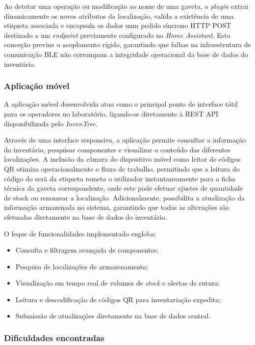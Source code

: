 \documentclass[10pt]{article}
\begin{document}
Ao detetar uma operação ou modificação ao nome de uma gaveta, o \textit{plugin} extrai dinamicamente os novos atributos da localização, valida a existência de uma etiqueta associada e encapsula os dados num pedido síncrono HTTP POST destinado a um \textit{endpoint} previamente configurado no \textit{Home Assistant}. Esta conceção previne o acoplamento rígido, garantindo que falhas na infraestrutura de comunicação BLE não corrompam a integridade operacional da base de dados do inventário.

\subsubsection{Aplicação móvel}

A aplicação móvel desenvolvida atua como o principal ponto de interface tátil para os operadores no laboratório, ligando-se diretamente à REST API disponibilizada pelo \textit{InvenTree}.

Através de uma interface responsiva, a aplicação permite consultar a informação do inventário, pesquisar componentes e visualizar o conteúdo das diferentes localizações. A inclusão da câmara do dispositivo móvel como leitor de códigos QR otimiza operacionalmente o fluxo de trabalho, permitindo que a leitura do código do ecrã da etiqueta remeta o utilizador instantaneamente para a ficha técnica da gaveta correspondente, onde este pode efetuar ajustes de quantidade de stock ou renomear a localização. Adicionalmente, possibilita a atualização da informação armazenada no sistema, garantindo que todas as alterações são efetuadas diretamente na base de dados do inventário.

O leque de funcionalidades implementado engloba:

\begin{itemize}
    \item Consulta e filtragem avançada de componentes;
    \item Pesquisa de localizações de armazenamento;
    \item Visualização em tempo real de volumes de \textit{stock} e alertas de rutura;
    \item Leitura e descodificação de códigos QR para inventariação expedita;
    \item Submissão de atualizações diretamente na base de dados central.
\end{itemize}

\subsubsection{Dificuldades encontradas}
\end{document}

